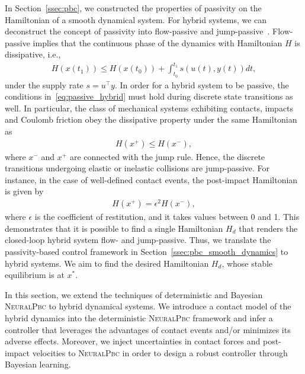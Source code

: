 %
In Section~\ref{ssec:pbc}, we constructed the properties of passivity on the
Hamiltonian of a smooth dynamical system.
%
For hybrid systems, we can deconstruct the concept of passivity into
flow-passive and jump-passive~\cite{naldi2013passivity}.
%
Flow-passive implies that the continuous phase of the dynamics with Hamiltonian
$H$ is dissipative, i.e., 
\begin{align}
    H(x(t_1)) \leq H(x(t_0)) + \int_{t_0}^{t_1} s(u(t), y(t)) dt,
    \label{eq:passive_hybrid}
\end{align}
\noindent under the supply rate $s=u^\top y$.
%
In order for a hybrid system to be passive, the conditions
in~\eqref{eq:passive_hybrid} must hold during discrete state transitions as well.
%
In particular, the class of mechanical systems exhibiting contacts, impacts and
Coulomb friction obey the dissipative property under the same Hamiltonian
as~\cite{van2007introduction}
%
\begin{align*}
    H(x^+) \leq H(x^-),
\end{align*}
%
\noindent where $x^-$ and $x^+$ are connected with the jump rule.
%
Hence, the discrete transitions undergoing elastic or inelastic collisions are
jump-passive.
%
For instance, in the case of well-defined contact events, the post-impact
Hamiltonian is given by
\begin{align*}
    H(x^+) = \epsilon^2 H(x^-),
\end{align*}
\noindent where $\epsilon$ is the coefficient of restitution, and it takes
values between 0 and 1.
%
This demonstrates that it is possible to find a single Hamiltonian $H_d$ that renders 
the closed-loop hybrid system flow- and jump-passive.
%
Thus, we translate the passivity-based control framework in
Section~\ref{ssec:pbc_smooth_dynamics} to hybrid systems.
%
We aim to find the desired Hamiltonian $H_d$, whose stable equilibrium is at
$x^*$.
%

In this section, we extend the techniques of deterministic and Bayesian
\textsc{NeuralPbc} to hybrid dynamical systems.
%
We introduce a contact model of the hybrid dynamics into the deterministic
\textsc{NeuralPbc} framework and infer a controller that leverages the
advantages of contact events and/or minimizes its adverse effects.
%
Moreover, we inject uncertainties in contact forces and post-impact velocities
to \textsc{NeuralPbc} in order to design a robust controller through Bayesian
learning.
%



